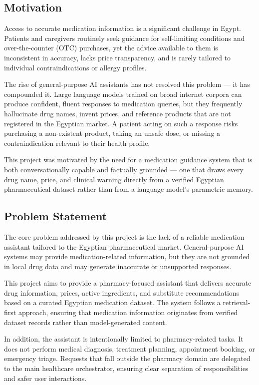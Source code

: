 \documentclass[12pt,a4paper]{article}
\begin{document}
\subsection{Motivation}

Access to accurate medication information is a significant challenge in Egypt.
Patients and caregivers routinely seek guidance for self-limiting conditions
and over-the-counter (OTC) purchases, yet the advice available to them is
inconsistent in accuracy, lacks price transparency, and is rarely tailored
to individual contraindications or allergy profiles.

The rise of general-purpose AI assistants has not resolved this problem ---
it has compounded it. Large language models trained on broad internet corpora
can produce confident, fluent responses to medication queries, but they
frequently hallucinate drug names, invent prices, and reference products
that are not registered in the Egyptian market. A patient acting on such
a response risks purchasing a non-existent product, taking an unsafe dose,
or missing a contraindication relevant to their health profile.

This project was motivated by the need for a medication guidance system that
is both conversationally capable and factually grounded --- one that draws
every drug name, price, and clinical warning directly from a verified
Egyptian pharmaceutical dataset rather than from a language model's
parametric memory.

\subsection{Problem Statement}

The core problem addressed by this project is the lack of a reliable medication
assistant tailored to the Egyptian pharmaceutical market. General-purpose AI
systems may provide medication-related information, but they are not grounded
in local drug data and may generate inaccurate or unsupported responses.

This project aims to provide a pharmacy-focused assistant that delivers accurate
drug information, prices, active ingredients, and substitute recommendations
based on a curated Egyptian medication dataset. The system follows a
retrieval-first approach, ensuring that medication information originates from
verified dataset records rather than model-generated content.

In addition, the assistant is intentionally limited to pharmacy-related tasks.
It does not perform medical diagnosis, treatment planning, appointment booking,
or emergency triage. Requests that fall outside the pharmacy domain are
delegated to the main healthcare orchestrator, ensuring clear separation of
responsibilities and safer user interactions.
\end{document}
